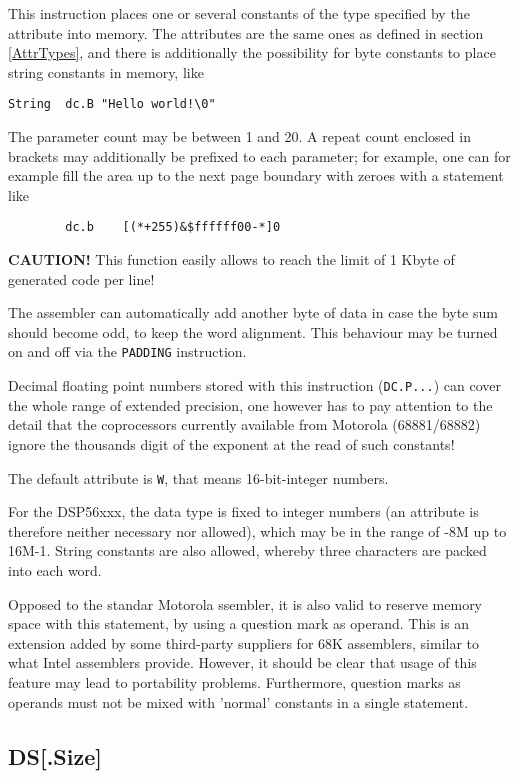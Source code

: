 \documentclass[12pt,twoside]{report}
\makeatletter
\newcommand{\bb}[1]{{\bf #1}}
\newcommand{\tty}[1]{{\tt #1}}
\newcommand{\ttindex}[1]{\index{#1@{\tt #1}}}
\makeatother
\begin{document}
This instruction places one or several constants of the type
specified by the attribute into memory.  The attributes are the same ones as
defined in section \ref{AttrTypes}, and there is additionally the
possibility for byte constants to place string constants in memory, like
\begin{verbatim}
String  dc.B "Hello world!\0"
\end{verbatim}
The parameter count may be between 1 and 20.  A repeat count enclosed
in brackets may additionally be prefixed to each parameter; for
example, one can for example fill the area up to the next page
boundary with zeroes with a statement like
\begin{verbatim}
        dc.b    [(*+255)&$ffffff00-*]0
\end{verbatim}
\bb{CAUTION!}  This function easily allows to reach the limit of 1 Kbyte
of generated code per line!

The assembler can automatically add another byte of data in case the byte sum
should become odd, to keep the word alignment.  This behaviour may be
turned on and off via the \tty{PADDING} instruction.

Decimal floating point numbers stored with this instruction (\tty{DC.P...})
can cover the whole range of extended precision, one however has to
pay attention to the detail that the coprocessors currently available
from Motorola (68881/68882) ignore the thousands digit of the
exponent at the read of such constants!

The default attribute is \tty{W}, that means 16-bit-integer numbers.

For the DSP56xxx, the data type is fixed to integer numbers (an attribute is
therefore neither necessary nor allowed), which may be in the range
of -8M up to 16M-1.  String constants are also allowed, whereby three characters
are packed into each word.

Opposed to the standar Motorola ssembler, it is also valid to reserve
memory space with this statement, by using a question mark as operand.
This is an extension added by some third-party suppliers for 68K
assemblers, similar to what Intel assemblers provide.  However, it should
be clear that usage of this feature may lead to portability problems.
Furthermore, question marks as operands must not be mixed with 'normal'
constants in a single statement.


\subsection{DS[.Size]}
\ttindex{DS}
\end{document}

